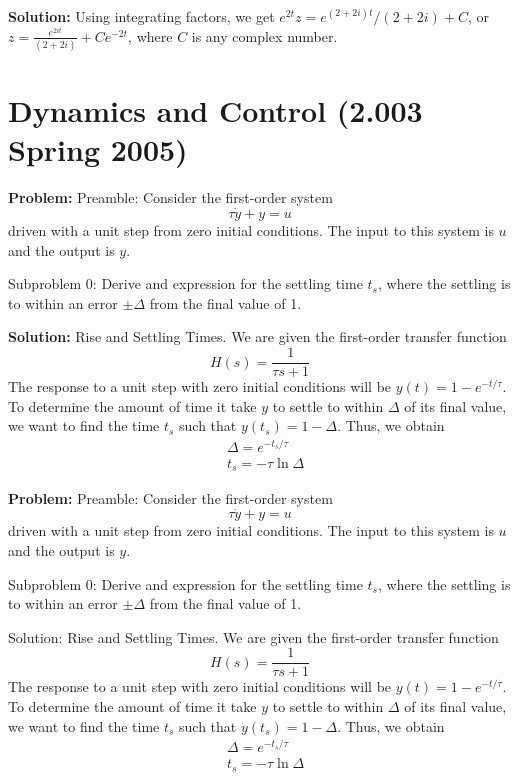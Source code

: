 \documentclass[10pt]{article}
\begin{document}
\textbf{Solution:}
Using integrating factors, we get $e^{2 t} z=e^{(2+2 i) t} /(2+2 i)+C$, or $z=\boxed{\frac{e^{2 i t}}{(2+2 i)}+C e^{-2 t}}$, where $C$ is any complex number.


\section{Dynamics and Control (2.003 Spring 2005)}

\textbf{Problem:}
Preamble: Consider the first-order system
\[
\tau \dot{y}+y=u
\]
driven with a unit step from zero initial conditions. The input to this system is \(u\) and the output is \(y\). 

Subproblem 0: Derive and expression for the settling time \(t_{s}\), where the settling is to within an error \(\pm \Delta\) from the final value of 1.


\textbf{Solution:}
Rise and Settling Times.  We are given the first-order transfer function
\[
H(s)=\frac{1}{\tau s+1}
\]
The response to a unit step with zero initial conditions will be \(y(t)=1-e^{-t / \tau}\). To determine the amount of time it take \(y\) to settle to within \(\Delta\) of its final value, we want to find the time \(t_{s}\) such that \(y\left(t_{s}\right)=1-\Delta\). Thus, we obtain
\[
\begin{aligned}
&\Delta=e^{-t_{s} / \tau} \\
&t_{s}=\boxed{-\tau \ln \Delta}
\end{aligned}
\]


\textbf{Problem:}
Preamble: Consider the first-order system
\[
\tau \dot{y}+y=u
\]
driven with a unit step from zero initial conditions. The input to this system is \(u\) and the output is \(y\). 

Subproblem 0: Derive and expression for the settling time \(t_{s}\), where the settling is to within an error \(\pm \Delta\) from the final value of 1.


Solution: Rise and Settling Times.  We are given the first-order transfer function
\[
H(s)=\frac{1}{\tau s+1}
\]
The response to a unit step with zero initial conditions will be \(y(t)=1-e^{-t / \tau}\). To determine the amount of time it take \(y\) to settle to within \(\Delta\) of its final value, we want to find the time \(t_{s}\) such that \(y\left(t_{s}\right)=1-\Delta\). Thus, we obtain
\[
\begin{aligned}
&\Delta=e^{-t_{s} / \tau} \\
&t_{s}=\boxed{-\tau \ln \Delta}
\end{aligned}
\]
\end{document}
